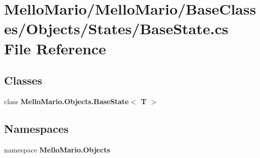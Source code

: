 \section{Mello\+Mario/\+Mello\+Mario/\+Base\+Classes/\+Objects/\+States/\+Base\+State.cs File Reference}
\label{BaseState_8cs}
\subsection*{Classes}
\begin{DoxyCompactItemize}
\item 
class \textbf{ Mello\+Mario.\+Objects.\+Base\+State$<$ T $>$}
\end{DoxyCompactItemize}
\subsection*{Namespaces}
\begin{DoxyCompactItemize}
\item 
namespace \textbf{ Mello\+Mario.\+Objects}
\end{DoxyCompactItemize}
